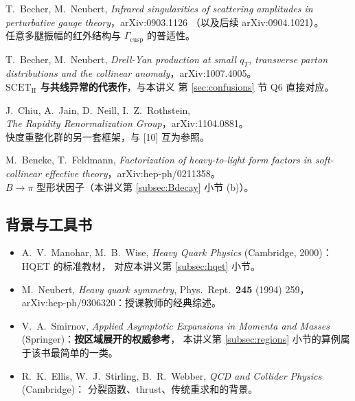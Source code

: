 \documentclass[UTF8,a4paper,11pt]{ctexart}
\theoremstyle{definition}
\theoremstyle{remark}
\theoremstyle{plain}
\newcommand{\Gcusp}{\Gamma_{\mathrm{cusp}}}
\newcommand{\SCETII}{\text{SCET}_{\mathrm{II}}}
\begin{document}
\begin{enumerate}[label=\textbf{[\arabic*]}, leftmargin=1.3cm, start=9]
\item T.~Becher, M.~Neubert,
      \emph{Infrared singularities of scattering amplitudes in
      perturbative gauge theory}，arXiv:0903.1126
      （以及后续 arXiv:0904.1021）。\\
      任意多腿振幅的红外结构与 $\Gcusp$ 的普适性。
\item T.~Becher, M.~Neubert,
      \emph{Drell-Yan production at small $q_T$, transverse parton
      distributions and the collinear anomaly}，arXiv:1007.4005。\\
      \textbf{$\SCETII$ 与共线异常的代表作}，与本讲义
      第 \ref{sec:confusions} 节 Q6 直接对应。
\item J.~Chiu, A.~Jain, D.~Neill, I.~Z.~Rothstein,\\
      \emph{The Rapidity Renormalization Group}，arXiv:1104.0881。\\
      快度重整化群的另一套框架，与 [10] 互为参照。
\item M.~Beneke, T.~Feldmann,
      \emph{Factorization of heavy-to-light form factors in
      soft-collinear effective theory}，arXiv:hep-ph/0211358。\\
      $B\to\pi$ 型形状因子（本讲义第 \ref{subsec:Bdecay} 小节 (b)）。
\end{enumerate}

\subsection{背景与工具书}

\begin{itemize}
  \item A.~V.~Manohar, M.~B.~Wise, \emph{Heavy Quark Physics}
        (Cambridge, 2000)：HQET 的标准教材，
        对应本讲义第 \ref{subsec:hqet} 小节。
  \item M.~Neubert, \emph{Heavy quark symmetry}, Phys.~Rept.~\textbf{245} (1994) 259，
        arXiv:hep-ph/9306320：授课教师的经典综述。
  \item V.~A.~Smirnov, \emph{Applied Asymptotic Expansions in Momenta and Masses}
        (Springer)：\textbf{按区域展开的权威参考}，
        本讲义第 \ref{subsec:regions} 小节的算例属于该书最简单的一类。
  \item R.~K.~Ellis, W.~J.~Stirling, B.~R.~Webber,
        \emph{QCD and Collider Physics} (Cambridge)：
        分裂函数、thrust、传统重求和的背景。
\end{itemize}
\end{document}
